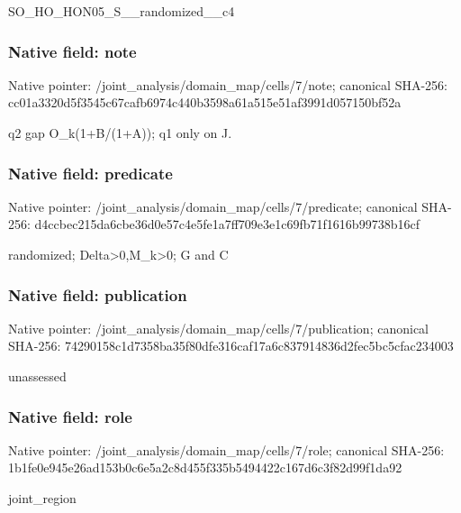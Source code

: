 \documentclass[10pt,a4paper]{article}
\begin{document}
\begingroup\raggedright\sloppy SO\_\allowbreak{}HO\_\allowbreak{}HON05\_\allowbreak{}S\_\allowbreak{}\_\allowbreak{}randomized\_\allowbreak{}\_\allowbreak{}c4\par\endgroup

\subsubsection{Native field: note}
Native pointer: /joint\_\allowbreak{}analysis/domain\_\allowbreak{}map/cells/7/note; canonical SHA-256: cc01a3320d5f3545c67cafb6974c440b3598a61a515e51af3991d057150bf52a

\begingroup\raggedright\sloppy q2 gap O\_\allowbreak{}k(1+B/\allowbreak{}(1+A));\allowbreak{} q1 only on J.\par\endgroup

\subsubsection{Native field: predicate}
Native pointer: /joint\_\allowbreak{}analysis/domain\_\allowbreak{}map/cells/7/predicate; canonical SHA-256: d4ccbec215da6cbe36d0e57c4e5fe1a7ff709e3e1c69fb71f1616b99738b16cf

\begingroup\raggedright\sloppy randomized;\allowbreak{} Delta>0,\allowbreak{}M\_\allowbreak{}k>0;\allowbreak{} G and C\par\endgroup

\subsubsection{Native field: publication}
Native pointer: /joint\_\allowbreak{}analysis/domain\_\allowbreak{}map/cells/7/publication; canonical SHA-256: 74290158c1d7358ba35f80dfe316caf17a6c837914836d2fec5bc5cfac234003

\begingroup\raggedright\sloppy unassessed\par\endgroup

\subsubsection{Native field: role}
Native pointer: /joint\_\allowbreak{}analysis/domain\_\allowbreak{}map/cells/7/role; canonical SHA-256: 1b1fe0e945e26ad153b0c6e5a2c8d455f335b5494422c167d6c3f82d99f1da92

\begingroup\raggedright\sloppy joint\_\allowbreak{}region\par\endgroup
\end{document}
